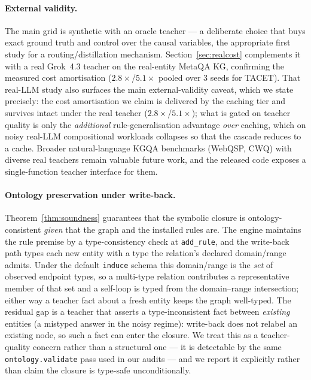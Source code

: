 \documentclass[11pt]{article}
\theoremstyle{plain}
\begin{document}
\paragraph{External validity.} The main grid is synthetic with an oracle
teacher --- a deliberate choice that buys exact ground truth and control over
the causal variables, the appropriate first study for a routing/distillation
mechanism. Section~\ref{sec:realcost} complements it with a real Grok~4.3
teacher on the real-entity MetaQA KG, confirming the measured cost
amortisation ($2.8\times$/$5.1\times$ pooled over 3 seeds for TACET). That real-LLM study also surfaces the main
external-validity caveat, which we state precisely: the cost amortisation we
claim is delivered by the caching tier and survives intact under the real
teacher ($2.8\times$/$5.1\times$); what is gated on teacher quality is only the
\emph{additional} rule-generalisation advantage \emph{over} caching, which on
noisy real-LLM compositional workloads collapses so that the cascade reduces
to a cache. Broader natural-language KGQA benchmarks (WebQSP, CWQ)
with diverse real teachers remain valuable future work, and the released code
exposes a single-function teacher interface for them.

\paragraph{Ontology preservation under write-back.} Theorem~\ref{thm:soundness}
guarantees that the symbolic closure is ontology-consistent \emph{given} that
the graph and the installed rules are. The engine maintains the rule premise
by a type-consistency check at \texttt{add\_rule}, and the write-back path
types each new entity with a type the relation's declared domain/range admits.
Under the default \texttt{induce} schema this domain/range is the \emph{set} of
observed endpoint types, so a multi-type relation contributes a representative
member of that set and a self-loop is typed from the domain--range intersection;
either way a teacher fact about a fresh entity keeps the graph well-typed. The
residual gap is a teacher
that asserts a type-inconsistent fact between \emph{existing} entities (a
mistyped answer in the noisy regime): write-back does not relabel an existing
node, so such a fact can enter the closure. We treat this as a teacher-quality
concern rather than a structural one --- it is detectable by the same
\texttt{ontology.validate} pass used in our audits --- and we report it
explicitly rather than claim the closure is type-safe unconditionally.
\end{document}
